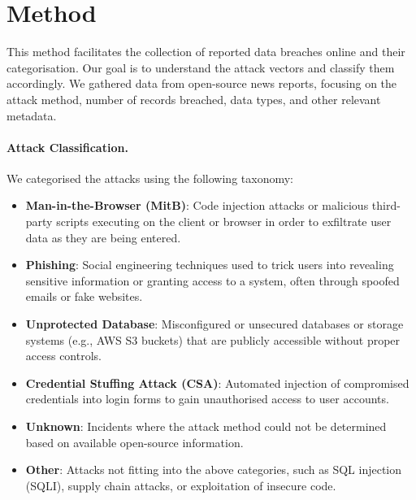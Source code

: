 \section{Method}
\label{sec::chp3::method}

This method facilitates the collection of reported data breaches online and their categorisation. Our goal is to understand the attack vectors and classify them accordingly. We gathered data from open-source news reports, focusing on the attack method, number of records breached, data types, and other relevant metadata.

\paragraph*{Attack Classification.} We categorised the attacks using the following taxonomy:
\begin{itemize}
\item \textbf{Man-in-the-Browser (MitB)}: Code injection attacks or malicious third-party scripts executing on the client or browser in order to exfiltrate user data as they are being entered. 

\item \textbf{Phishing}: Social engineering techniques used to trick users into revealing sensitive information or granting access to a system, often through spoofed emails or fake websites.
\item \textbf{Unprotected Database}: Misconfigured or unsecured databases or storage systems (e.g., AWS S3 buckets) that are publicly accessible without proper access controls.

\item \textbf{Credential Stuffing Attack (CSA)}: Automated injection of compromised credentials into login forms to gain unauthorised access to user accounts.

\item \textbf{Unknown}: Incidents where the attack method could not be determined based on available open-source information.

\item \textbf{Other}: Attacks not fitting into the above categories, such as SQL injection (SQLI), supply chain attacks, or exploitation of insecure code.
\end{itemize}
